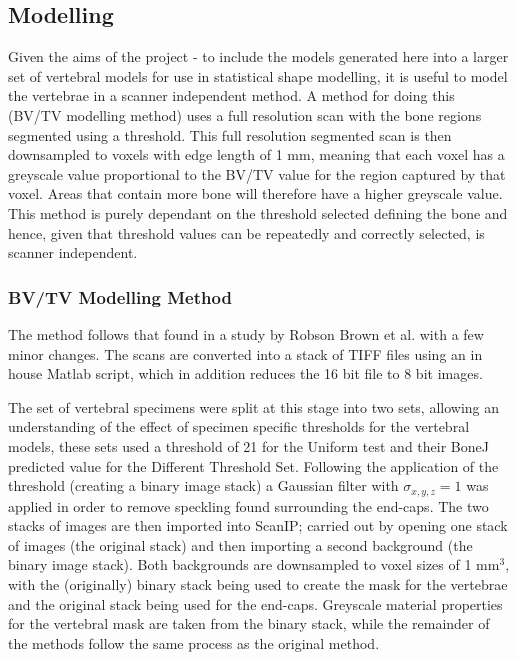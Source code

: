 \subsection{Modelling}

Given the aims of the project - to include the models generated here into a
larger set of vertebral models for use in statistical shape modelling, it is
useful to model the vertebrae in a scanner independent method.
A method for doing this (BV/TV modelling method) uses a full resolution scan
with the bone regions segmented using a threshold.
This full resolution segmented scan is then downsampled to voxels with edge
length of 1 mm, meaning that each voxel has a greyscale value proportional to
the BV/TV value for the region captured by that voxel.
Areas that contain more bone will therefore have a higher greyscale value.
This method is purely dependant on the threshold selected defining the bone and
hence, given that threshold values can be repeatedly and correctly selected, is
scanner independent.

\subsubsection{BV/TV Modelling Method}

The method follows that found in a study by Robson Brown et al. \cite{RobsonBrown2014} with a few minor changes.
The scans are converted into a stack of TIFF files using an in house Matlab script, which in addition reduces the 16 bit file to 8 bit images.



The set of vertebral specimens were split at this stage into two sets, allowing an understanding of the effect of specimen specific thresholds for the vertebral models, these sets used a threshold of 21 for the Uniform test and their BoneJ predicted value for the Different Threshold Set.
Following the application of the threshold (creating a binary image stack) a Gaussian filter with $ \sigma_{x,y,z} = 1 $ was applied in order to remove speckling found surrounding the end-caps.
The two stacks of images are then imported into ScanIP; carried out by opening one stack of images (the original stack) and then importing a second background (the binary image stack).
Both backgrounds are downsampled to voxel sizes of 1 mm$^3$, with the (originally) binary stack being used to create the mask for the vertebrae and the original stack being used for the end-caps.
Greyscale material properties for the vertebral mask are taken from the binary stack, while the remainder of the methods follow the same process as the original method.

